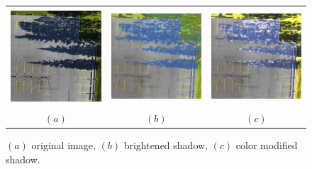 \documentclass{m2pi}
\begin{document}
\begin{figure}[htp]
\centering
\begin{tabular}{ccc}
\includegraphics[height=3.61cm, width=3.81cm]{figures/Resized_Lot11.jpg}&
\includegraphics[width=3.8cm]{figures/Brightened Shadow.png}&
\includegraphics[width=3.8cm]{figures/Color Modified Shadow.png}\\
$(a)$ & $(b)$ & $(c)$
\end{tabular}
\caption{$(a)$ original image, $(b)$ brightened shadow, $(c)$ color modified shadow.}
\label{lot11shadow}
\end{figure}
\end{document}
